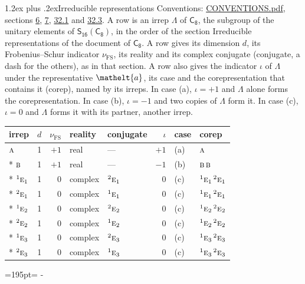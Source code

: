 \documentclass[10pt,a4paper]{article}
\makeatletter
\renewcommand\section{\@startsection{section}{1}{\z@}{-3ex plus -1ex minus -.2ex}%
  {1.2ex plus .2ex}{\normalfont\large\sffamily\bfseries\color{parttitle}}}
\newcommand{\needspace}[1]{\par\penalty-100\begingroup\dimen0=#1\relax\dimen2=\pagegoal
  \advance\dimen2-\pagetotal\ifdim\dimen0>\dimen2\relax\ifdim\dimen2>0pt\vfil\break\fi\fi
  \endgroup}
\numberwithin{equation}{section}
\newcommand{\eltfont}[1]{{\let\sigma\eltsigma\mathelt{#1}}}
\newcommand{\grp}[1]{\mathsf{#1}}
\newcommand{\irr}[1]{\text{\normalfont\scshape #1}}
\newcommand{\conjpair}[1]{{}^{#1}}
\newcommand{\elt}[1]{\eltfont{#1}}
\newcommand{\fsind}{\nu_{\mathrm{FS}}}
\makeatother
\begin{document}
\section{Irreducible representations}\label{s:irreps}
Conventions: \href{../../CONVENTIONS.pdf}{CONVENTIONS.pdf}, sections \href{../../../rotation/CONVENTIONS.pdf\#conv.6}{6}, \href{../../../rotation/CONVENTIONS.pdf\#conv.7}{7}, \href{../../CONVENTIONS.pdf\#conv.32.1}{32.1} and \href{../../CONVENTIONS.pdf\#conv.32.3}{32.3}.
\leavevmode\label{n:irrep.Delta}A row is an irrep $\Lambda$ of $\grp{C_{8}}$, the subgroup of the unitary elements of $\grp{S_{16}}(\grp{C_{8}})$, in the order of the section Irreducible representations of the document of \href{../../../rotation/data/pdf/C8.pdf}{$\grp{C_{8}}$}. \label{n:index.dimension}\label{n:index.frobenius}\label{n:head.irrep}\label{n:head.reality}\label{n:head.conjugate}A row gives its dimension $d$, its Frobenius--Schur indicator $\fsind$, its reality and its complex conjugate (conjugate, a dash for the others), as in that section. \label{n:head.case.corep}\label{n:head.corep}A row also gives the indicator $\iota$ of $\Lambda$ under the representative $\elt{a}$, its case and the corepresentation that contains it (corep), named by its irreps. In case (a), $\iota = +1$ and $\Lambda$ alone forms the corepresentation. In case (b), $\iota = -1$ and two copies of $\Lambda$ form it. In case (c), $\iota = 0$ and $\Lambda$ forms it with its partner, another irrep.
\setlength{\emergencystretch}{2em}\par\setlength{\emergencystretch}{0pt}
{\small\renewcommand{\arraystretch}{1.25}\setlength{\tabcolsep}{4pt}\begin{longtable}{@{}lrrllrll@{}}\toprule
irrep & $d$ & $\fsind$ & reality & conjugate & $\iota$ & case & corep\\\midrule\endhead
\bottomrule\endfoot\endlastfoot
$\irr{a}$ & 1 & $+1$ & real & --- & $+1$ & (a) & $\irr{a}$\\*
$\irr{b}$ & 1 & $+1$ & real & --- & $-1$ & (b) & $\irr{b}\,\irr{b}$\\*
$\conjpair{1}\irr{e}_{1}$ & 1 & $0$ & complex & $\conjpair{2}\irr{e}_{1}$ & $0$ & (c) & $\conjpair{1}\irr{e}_{1}\,\conjpair{2}\irr{e}_{1}$\\*
$\conjpair{2}\irr{e}_{1}$ & 1 & $0$ & complex & $\conjpair{1}\irr{e}_{1}$ & $0$ & (c) & $\conjpair{1}\irr{e}_{1}\,\conjpair{2}\irr{e}_{1}$\\*
$\conjpair{1}\irr{e}_{2}$ & 1 & $0$ & complex & $\conjpair{2}\irr{e}_{2}$ & $0$ & (c) & $\conjpair{1}\irr{e}_{2}\,\conjpair{2}\irr{e}_{2}$\\*
$\conjpair{2}\irr{e}_{2}$ & 1 & $0$ & complex & $\conjpair{1}\irr{e}_{2}$ & $0$ & (c) & $\conjpair{1}\irr{e}_{2}\,\conjpair{2}\irr{e}_{2}$\\*
$\conjpair{1}\irr{e}_{3}$ & 1 & $0$ & complex & $\conjpair{2}\irr{e}_{3}$ & $0$ & (c) & $\conjpair{1}\irr{e}_{3}\,\conjpair{2}\irr{e}_{3}$\\*
$\conjpair{2}\irr{e}_{3}$ & 1 & $0$ & complex & $\conjpair{1}\irr{e}_{3}$ & $0$ & (c) & $\conjpair{1}\irr{e}_{3}\,\conjpair{2}\irr{e}_{3}$\\
\bottomrule\end{longtable}}
\needspace{195pt}
\end{document}
